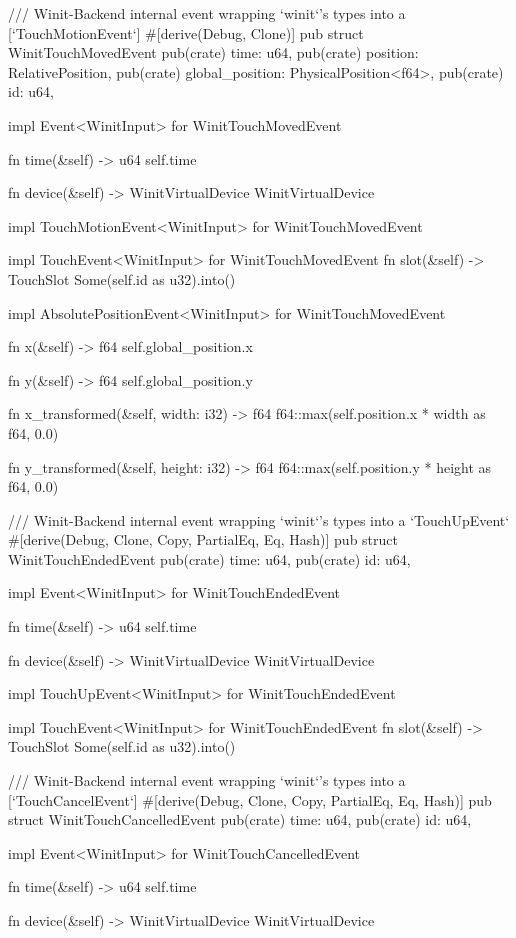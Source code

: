 /// Winit-Backend internal event wrapping `winit`'s types into a [`TouchMotionEvent`]
#[derive(Debug, Clone)]
pub struct WinitTouchMovedEvent {
    pub(crate) time: u64,
    pub(crate) position: RelativePosition,
    pub(crate) global_position: PhysicalPosition<f64>,
    pub(crate) id: u64,
}

impl Event<WinitInput> for WinitTouchMovedEvent {
    fn time(&self) -> u64 {
        self.time
    }

    fn device(&self) -> WinitVirtualDevice {
        WinitVirtualDevice
    }
}

impl TouchMotionEvent<WinitInput> for WinitTouchMovedEvent {}

impl TouchEvent<WinitInput> for WinitTouchMovedEvent {
    fn slot(&self) -> TouchSlot {
        Some(self.id as u32).into()
    }
}

impl AbsolutePositionEvent<WinitInput> for WinitTouchMovedEvent {
    fn x(&self) -> f64 {
        self.global_position.x
    }

    fn y(&self) -> f64 {
        self.global_position.y
    }

    fn x_transformed(&self, width: i32) -> f64 {
        f64::max(self.position.x * width as f64, 0.0)
    }

    fn y_transformed(&self, height: i32) -> f64 {
        f64::max(self.position.y * height as f64, 0.0)
    }
}

/// Winit-Backend internal event wrapping `winit`'s types into a `TouchUpEvent`
#[derive(Debug, Clone, Copy, PartialEq, Eq, Hash)]
pub struct WinitTouchEndedEvent {
    pub(crate) time: u64,
    pub(crate) id: u64,
}

impl Event<WinitInput> for WinitTouchEndedEvent {
    fn time(&self) -> u64 {
        self.time
    }

    fn device(&self) -> WinitVirtualDevice {
        WinitVirtualDevice
    }
}

impl TouchUpEvent<WinitInput> for WinitTouchEndedEvent {}

impl TouchEvent<WinitInput> for WinitTouchEndedEvent {
    fn slot(&self) -> TouchSlot {
        Some(self.id as u32).into()
    }
}

/// Winit-Backend internal event wrapping `winit`'s types into a [`TouchCancelEvent`]
#[derive(Debug, Clone, Copy, PartialEq, Eq, Hash)]
pub struct WinitTouchCancelledEvent {
    pub(crate) time: u64,
    pub(crate) id: u64,
}

impl Event<WinitInput> for WinitTouchCancelledEvent {
    fn time(&self) -> u64 {
        self.time
    }

    fn device(&self) -> WinitVirtualDevice {
        WinitVirtualDevice
    }
}

